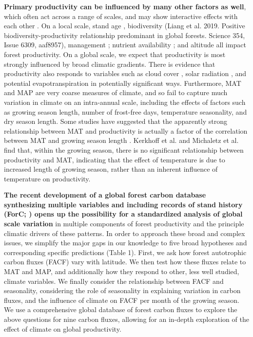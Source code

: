 \documentclass[]{article}
\begin{document}
\textbf{Primary productivity can be influenced by many other factors as
well}, which often act across a range of scales, and may show
interactive effects with each other
\citep{cleveland_relationships_2011}. On a local scale, stand age
\citep{litton_carbon_2007, gillman_latitude_2015}, biodiversity (Liang
et al. 2019. Positive biodiversity-productivity relationship predominant
in global forests. Science 354, Issue 6309, aaf8957), management
\citep{simova_enigma_2017}; nutrient availability
\citep{aragao_above-_2009}; and altitude
\citep{girardin_net_2010, malhi_variation_2017} all impact forest
productivity. On a global scale, we expect that productivity is most
strongly influenced by broad climatic gradients. There is evidence that
productivity also responds to variables such as cloud cover
\citep{taylor_temperature_2017}, solar radiation
\citep{fyllas_solar_2017}, and potential evapotranspiration
\citep{kerkhoff_plant_2005} in potentially significant ways.
Furthermore, MAT and MAP are very coarse measures of climate, and so
fail to capture much variation in climate on an intra-annual scale,
including the effects of factors such as growing season length, number
of frost-free days, temperature seasonality, and dry season length. Some
studies have suggested that the apparently strong relationship between
MAT and productivity is actually a factor of the correlation between MAT
and growing season length
\citep{kerkhoff_plant_2005, malhi_productivity_2012, michaletz_convergence_2014, michaletz_drivers_2018}.
Kerkhoff et al. \citeyearpar{kerkhoff_plant_2005} and Michaletz et al.
\citeyearpar{michaletz_convergence_2014} find that, within the growing
season, there is no significant relationship between productivity and
MAT, indicating that the effect of temperature is due to increased
length of growing season, rather than an inherent influence of
temperature on productivity.

\textbf{The recent development of a global forest carbon database
synthesizing multiple variables and including records of stand history
(ForC;
\citep{anderson-teixeira_carbon_2016, anderson-teixeira_forc:_2018})
opens up the possibility for a standardized analysis of global scale
variation} in multiple components of forest productivity and the
principle climatic drivers of these patterns. In order to approach these
broad and complex issues, we simplify the major gaps in our knowledge to
five broad hypotheses and corresponding specific predictions (Table 1).
First, we ask how forest autotrophic carbon fluxes (FACF) vary with
latitude. We then test how these fluxes relate to MAT and MAP, and
additionally how they respond to other, less well studied, climate
variables. We finally consider the relationship between FACF and
seasonality, considering the role of seasonality in explaining variation
in carbon fluxes, and the influence of climate on FACF per month of the
growing season. We use a comprehensive global database of forest carbon
fluxes to explore the above questions for nine carbon fluxes, allowing
for an in-depth exploration of the effect of climate on global
productivity.
\end{document}
